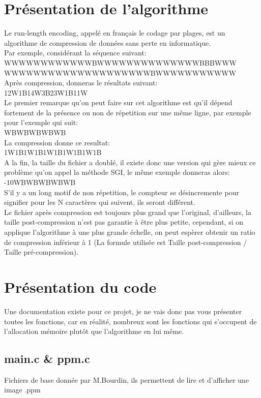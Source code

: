 \documentclass[12pt, letterpaper]{article}
\begin{document}
\section{Présentation de l'algorithme}
Le run-length encoding, appelé en français le codage par plages,
est un algorithme de compression de données sans perte en informatique. \\
Par exemple, considérant la séquence suivant:\\
WWWWWWWWWWWWBWWWWWWWWWWWWWWBBBWWW\\WWWWWWWWWWWWWWWWWWWWBWWWWWWWWWWW\\
Après compression, donneras le résultats suivant:\\
12W1B14W3B23W1B11W\\
Le premier remarque qu'on peut faire sur cet algorithme est qu'il dépend fortement de la présence ou non de 
répetition sur une même ligne, par exemple pour l'exemple qui suit:\\
WBWBWBWBWB\\
La compression donne ce resultat:\\
1W1B1W1B1W1B1W1B1W1B\\
A la fin, la taille du fichier a doublé, il existe donc une version qui gère mieux ce problème 
qu'on appel la méthode SGI, le même exemple donneras alors:\\
-10WBWBWBWBWB\\
S'il y a un long motif de non répetition, le compteur se désincremente pour signifier pour les N caractères qui suivent, 
ils seront différent.\\
Le fichier après compression est toujours plus grand que l'original, d'ailleurs, la taille post-compression n'est pas garantie à être plus petite, cependant, si on applique l'algorithme à une plus grande échelle, 
on peut espèrer obtenir un ratio de compression inférieur à 1 (La formule utilisée est Taille post-compression / Taille pré-compression).

\section{Présentation du code}
Une documentation existe pour ce projet, je ne vais donc pas vous présenter toutes les fonctions, car en réalité, nombreux sont les fonctions qui 
s'occupent de l'allocation mémoire plutôt que l'algorithme en lui même.
\subsection{main.c \& ppm.c}
Fichiers de base donnée par M.Bourdin, ils permettent de lire et d'afficher une image .ppm
\end{document}
